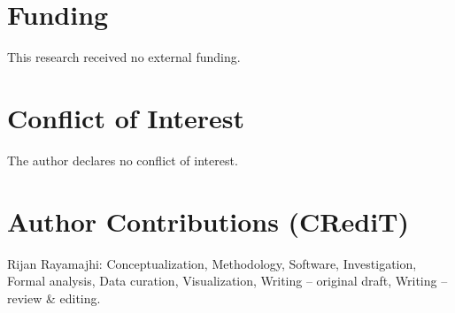 \documentclass[11pt]{article}
\begin{document}
\section*{Funding}

This research received no external funding.

\section*{Conflict of Interest}

The author declares no conflict of interest.

\section*{Author Contributions (CRediT)}

Rijan Rayamajhi: Conceptualization, Methodology, Software, Investigation, Formal analysis, Data curation, Visualization, Writing -- original draft, Writing -- review \& editing.



\end{document}
